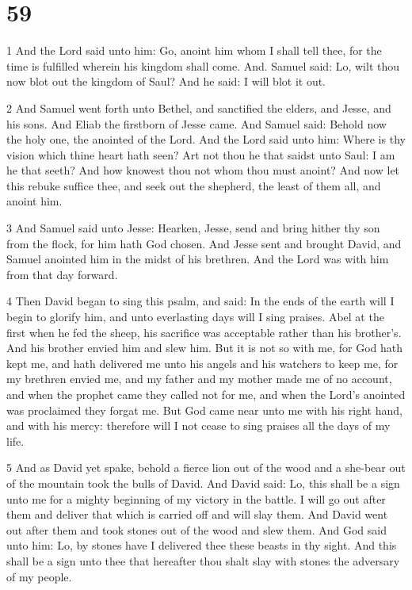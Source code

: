 \chapter{59}

\par 1 And the Lord said unto him: Go, anoint him whom I shall tell thee, for the time is fulfilled wherein his kingdom shall come. And. Samuel said: Lo, wilt thou now blot out the kingdom of Saul? And he said: I will blot it out. 

\par 2 And Samuel went forth unto Bethel, and sanctified the elders, and Jesse, and his sons. And Eliab the firstborn of Jesse came. And Samuel said: Behold now the holy one, the anointed of the Lord. And the Lord said unto him: Where is thy vision which thine heart hath seen? Art not thou he that saidst unto Saul: I am he that seeth? And how knowest thou not whom thou must anoint? And now let this rebuke suffice thee, and seek out the shepherd, the least of them all, and anoint him. 

\par 3 And Samuel said unto Jesse: Hearken, Jesse, send and bring hither thy son from the flock, for him hath God chosen. And Jesse sent and brought David, and Samuel anointed him in the midst of his brethren. And the Lord was with him from that day forward.

\par 4 Then David began to sing this psalm, and said: In the ends of the earth will I begin to glorify him, and unto everlasting days will I sing praises. Abel at the first when he fed the sheep, his sacrifice was acceptable rather than his brother's. And his brother envied him and slew him. But it is not so with me, for God hath kept me, and hath delivered me unto his angels and his watchers to keep me, for my brethren envied me, and my father and my mother made me of no account, and when the prophet came they called not for me, and when the Lord's anointed was proclaimed they forgat me. But God came near unto me with his right hand, and with his mercy: therefore will I not cease to sing praises all the days of my life.

\par 5 And as David yet spake, behold a fierce lion out of the wood and a she-bear out of the mountain took the bulls of David. And David said: Lo, this shall be a sign unto me for a mighty beginning of my victory in the battle. I will go out after them and deliver that which is carried off and will slay them. And David went out after them and took stones out of the wood and slew them. And God said unto him: Lo, by stones have I delivered thee these beasts in thy sight. And this shall be a sign unto thee that hereafter thou shalt slay with stones the adversary of my people.

